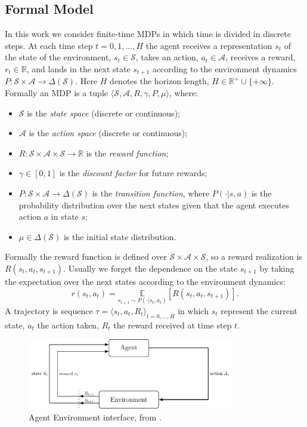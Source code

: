  \subsection{Formal Model}
In this work we consider finite-time MDPs in which time is divided in discrete steps. At each time step $t = 0,1,...,H$ the agent receives a representation $s_t$ of the state of the environment, $s_t \in \mathcal{S}$, takes an action, $a_t \in \mathcal{A}$, receives a reward, $r_t \in \mathbb{R}$, and lands in the next state $s_{t+1}$ according to the environment dynamics $P: \mathcal{S} \times \mathcal{A} \rightarrow \Delta(\mathcal{S})$. Here $H$ denotes the horizon length, $H \in \mathbb{R}^+ \cup \{+\infty \} $.\newline
Formally an MDP is a tuple $\langle\mathcal{S}, \mathcal{A}, R, \gamma, P, \mu\rangle$, where:
\begin{itemize}
\item $\mathcal{S}$ is  the \textit{state space} (discrete or continuous);
\item $\mathcal{A}$ is the \textit{action space}  (discrete or continuous);
\item $R : \mathcal{S} \times \mathcal{A} \times \mathcal{S} \rightarrow \mathbb{R}$ is the \textit{reward function};
\item $\gamma \in [0,1]$ is the \textit{discount factor} for future rewards;
\item $P: \mathcal{S} \times \mathcal{A} \rightarrow \Delta (\mathcal{S})$ is the \textit{transition function}, where $P(\cdot | s, a)$ is the probability distribution over the next states given that the agent executes action $a$ in state $s$;
\item $\mu \in \Delta(\mathcal{S}) $ is the initial state distribution.
\end{itemize}

Formally the reward function is defined over $\mathcal{S} \times \mathcal{A} \times \mathcal{S} $, so a reward realization is \newline $R(s_t,a_t,s_{t+1})$. Usually we forget the dependence on the state $s_{t+1}$ by taking the expectation over the next states according to the environment dynamics:
\begin{equation}
	r(s_t,a_t) = \underset{s_{t+1} \sim P(\cdot | s_t, a_t)}{\mathbb{E}} \left[R(s_t,a_t,s_{t+1})\right] .
\end{equation}
A trajectory is sequence $\tau=\langle s_t, a_t, R_t\rangle_{t=0,...,H}$ in which $s_t$ represent the current state, $a_t$ the action taken, $R_t$ the reward received at time step $t$.
\begin{figure}[tb!]
\centering
\includegraphics[width=0.8\textwidth]{pictures/agentenv}
\caption{\small Agent Environment interface, from \citep{sutton_introduction}.}
\end{figure}

